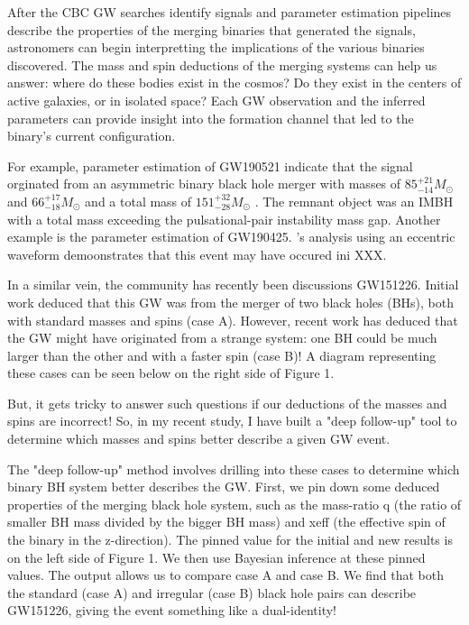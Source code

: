 After the CBC GW searches identify signals and parameter estimation pipelines describe the properties of the merging binaries that generated the signals, astronomers can begin interpretting the implications of the various binaries discovered.
The mass and spin deductions of the merging systems can help us answer: where do these bodies exist in the cosmos? 
Do they exist in the centers of active galaxies, or in isolated space?
Each GW observation and the inferred parameters can provide insight into the formation channel that led to the binary's current configuration.

For example, parameter estimation of GW190521 indicate that the signal orginated from an asymmetric binary black hole merger with masses of $85^{+21}_{-14}M_{\odot}$ and $66^{+17}_{-18}M_{\odot}$ and a total mass of $151^{+32}_{-28}M_{\odot}$ \citep{Abbott:2020tfl}.
The remnant object was an IMBH with a total mass exceeding the pulsational-pair instability mass gap.
Another example is the parameter estimation of GW190425. 
\citep{}'s analysis using an eccentric waveform demoonstrates that this event may have occured ini XXX.

In a similar vein, the community has recently been discussions GW151226. Initial work deduced that this GW was from the merger of two black holes (BHs), both with standard masses and spins (case A). However, recent work has deduced that the GW might have originated from a strange system: one BH could be much larger than the other and with a faster spin (case B)! A diagram representing these cases can be seen below on the right side of Figure 1.



But, it gets tricky to answer such questions if our deductions of the masses and spins are incorrect! So, in my recent study, I have built a "deep follow-up" tool to determine which masses and spins better describe a given GW event. 


The "deep follow-up" method involves drilling into these cases to determine which binary BH system better describes the GW. First, we pin down some deduced properties of the merging black hole system, such as the mass-ratio q (the ratio of smaller BH mass divided by the bigger BH mass) and xeff (the effective spin of the binary in the z-direction). The pinned value for the initial and new results is on the left side of Figure 1. We then use Bayesian inference at these pinned values. The output allows us to compare case A and case B. We find that both the standard (case A) and irregular (case B) black hole pairs can describe GW151226, giving the event something like a dual-identity! 

